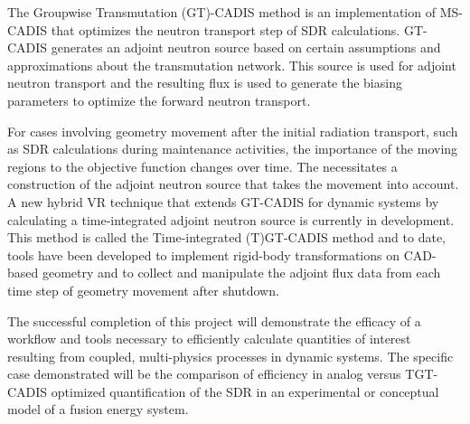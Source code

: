 \documentclass[12pt]{article}
\begin{document}
The Groupwise Transmutation (GT)-CADIS method 
is an implementation of MS-CADIS
that optimizes the neutron transport step of SDR calculations.
GT-CADIS generates an adjoint
neutron source based on certain assumptions and approximations about the
transmutation network.  
This source is used for adjoint neutron transport and the resulting flux is used to
generate the biasing parameters to optimize the forward neutron transport.

For cases involving geometry movement after the initial radiation transport,
such as SDR calculations
during maintenance activities,
the importance %
of the moving regions
to the objective function changes over time.
The necessitates a construction of the adjoint neutron source that takes
the movement into account.
A new hybrid VR technique that extends 
GT-CADIS for dynamic systems by calculating a time-integrated adjoint
neutron source is currently in development.
This method is called the Time-integrated (T)GT-CADIS method and to date,
tools have been developed to implement 
rigid-body transformations on CAD-based geometry %
and to collect and manipulate the adjoint
flux data from each time step of geometry movement after shutdown.

The successful completion of this project will demonstrate the efficacy of a workflow and tools
necessary to efficiently calculate quantities of interest resulting from
coupled, multi-physics processes in dynamic systems.  
The specific case demonstrated will be the comparison of efficiency in analog
versus TGT-CADIS optimized quantification of the SDR in an experimental or conceptual
model of a fusion energy system.
\end{document}

